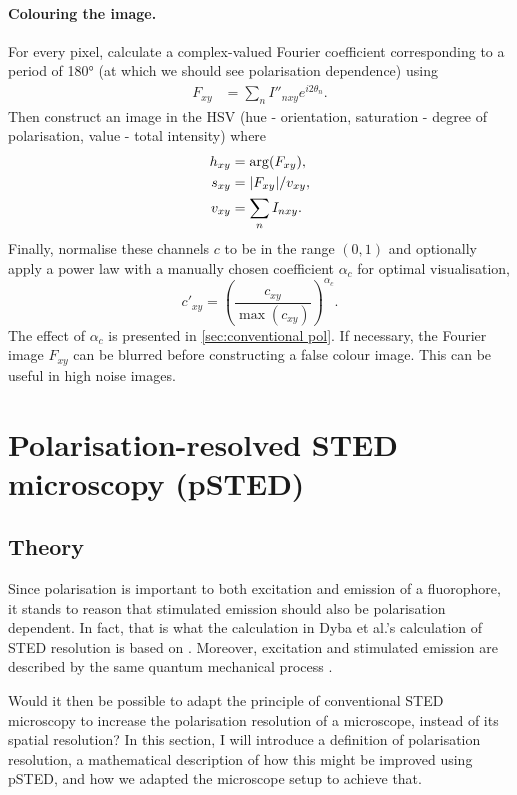 \paragraph{Colouring the image.} For every pixel, calculate a complex-valued Fourier coefficient corresponding to a period of \ang{180} (at which we should see polarisation dependence) using
\begin{align}
	F_{xy} &= \sum_n I''_{nxy} e^{i2\theta_n}.
\end{align}
Then construct an image in the HSV (hue - orientation, saturation - degree of polarisation, value - total intensity) where 
\begin{align}
	h_{xy} &= \arg (F_{xy}),\\
	s_{xy} &= \abs{F_{xy}}/v_{xy},\\
	v_{xy} &= \sum_n I_{nxy}.
\end{align}
Finally, normalise these channels $ c $ to be in the range $ (0,1) $ and optionally apply a power law with a manually chosen coefficient $ \alpha_c $ for optimal visualisation,
\begin{equation}
	c'_{xy} = \left( \frac{c_{xy}}{\max (c_{xy})} \right)^{\alpha_c}.
\end{equation}
The effect of $ \alpha_c $ is presented in \autoref{sec:conventional pol}. If necessary, the Fourier image $ F_{xy} $ can be blurred before constructing a false colour image. This can be useful in high noise images.

\section{Polarisation-resolved STED microscopy (pSTED)}
\subsection{Theory}
\label{sec:psted theory}

Since polarisation is important to both excitation and emission of a fluorophore, it stands to reason that stimulated emission should also be polarisation dependent. In fact, that is what the calculation in Dyba et al.'s calculation of STED resolution is based on \cite{Harke2008, Dyba2005}. Moreover, excitation and stimulated emission are described by the same quantum mechanical process \cite{Foot}.

Would it then be possible to adapt the principle of conventional STED microscopy to increase the polarisation resolution of a microscope, instead of its spatial resolution? In this section, I will introduce a definition of polarisation resolution, a mathematical description of how this might be improved using pSTED, and how we adapted the microscope setup to achieve that. 

